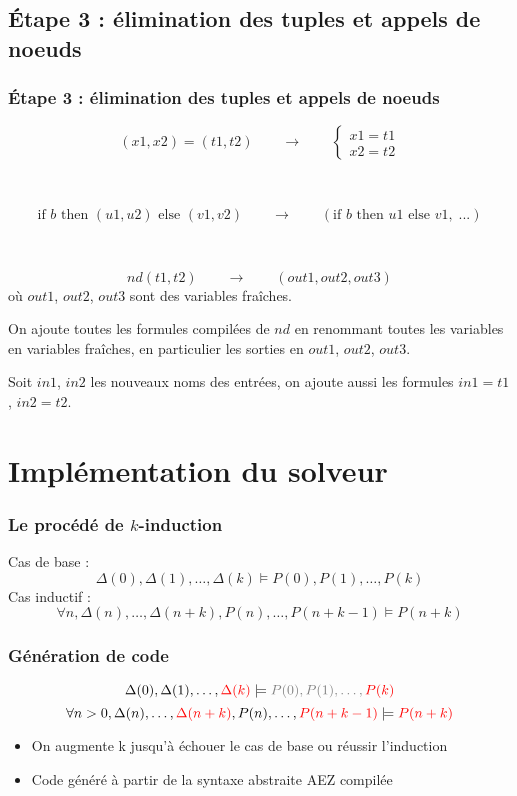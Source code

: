 \documentclass[18pt]{beamer}
\begin{document}
\subsection{Étape 3 :
élimination des tuples et appels de noeuds}
\begin{frame}
\frametitle{Étape 3 :
élimination des tuples et appels de noeuds}
	
	
	$$(x1,x2) = (t1, t2) \qquad\longrightarrow\qquad
	\begin{cases}
		x1 = t1 
		\\
		x2 = t2
	\end{cases}$$
	
	\
	
	$$\text{if }b \text{ then } (u1,u2) \text{ else } (v1,v2)
	\qquad\longrightarrow\qquad
	(\text{if }b \text{ then } u1 \text{ else } v1,\;
	...
	)$$
	
	\
	
	$$nd(t1,t2)
	\qquad\longrightarrow\qquad
	(out1,out2,out3)$$
	où $out1$, $out2$, $out3$ sont des variables fraîches.
	
	On ajoute toutes les formules compilées de $nd$ en renommant toutes les variables en variables fraîches, en particulier les sorties en $out1$, $out2$, $out3$.
	
	Soit $in1$, $in2$ les nouveaux noms des entrées, on ajoute aussi les formules $in1=t1$, $in2=t2$.
	
	
	
\end{frame}



\section{Implémentation du solveur}
\begin{frame}
	\frametitle{Le procédé de $k$-induction}
	Cas de base :	$$\Delta(0), \Delta(1), \ldots, \Delta(k) \models  P(0), P(1), \ldots,  P(k)$$
	Cas inductif : $$\forall n, {\Delta(n), \ldots, \Delta(n+k), P(n), \ldots, P(n+k-1) \models P(n+k)}$$

\end{frame}	
\begin{frame}
	\frametitle{Génération de code}

		
			$$\Delta(0), \Delta(1), \ldots, \color{red} \Delta(k) \color{black} \models \color{gray} P(0), P(1), \ldots, \color{red} P(k)\color{black}$$
			$$\forall n>0, {\Delta(n), \ldots, \color{red} \Delta(n+k) \color{black}, P(n), \ldots, \color{red}P(n+k-1) \color{black} \models  \color{red}P(n+k)}\color{black}$$
	\begin{itemize}
		\item{On augmente k jusqu'à échouer le cas de base ou réussir l'induction}
		\item{Code généré à partir de la syntaxe abstraite AEZ compilée}
	\end{itemize}	
\end{frame}
\end{document}
